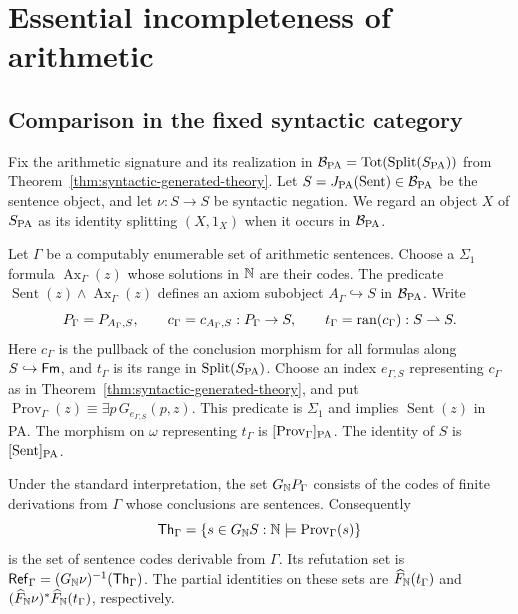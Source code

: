 \section{Essential incompleteness of arithmetic}\label{sec:arithmetic}

\subsection{Comparison in the fixed syntactic category}
\label{subsec:arithmetic-internal-comparison}

Fix the arithmetic signature and its realization in
$\mathcal B_{\mathrm{PA}}=\operatorname{Tot}(\operatorname{Split}(S_{\mathrm{PA}}))$ from
Theorem~\ref{thm:syntactic-generated-theory}.
Let $S=J_{\mathrm{PA}}(\operatorname{Sent})\in\mathcal B_{\mathrm{PA}}$ be
the sentence object, and let
$\nu:S\to S$ be syntactic negation.
We regard an object $X$ of $S_{\mathrm{PA}}$ as its identity splitting
$(X,1_X)$ when it occurs in $\mathcal B_{\mathrm{PA}}$.

Let $\Gamma$ be a computably enumerable set of arithmetic
sentences. Choose a $\Sigma_1$ formula
$\operatorname{Ax}_\Gamma(z)$ whose solutions in $\mathbb N$ are their codes.
The predicate
$\operatorname{Sent}(z)\land\operatorname{Ax}_\Gamma(z)$
defines an axiom subobject $A_\Gamma\hookrightarrow S$ in
$\mathcal B_{\mathrm{PA}}$. Write
\[
 P_\Gamma=P_{A_\Gamma,S},\qquad
 c_\Gamma=c_{A_\Gamma,S}:P_\Gamma\to S,\qquad
 t_\Gamma=\operatorname{ran}(c_\Gamma):S\rightharpoonup S.
\]
Here $c_\Gamma$ is the pullback of the conclusion morphism for all
formulas along $S\hookrightarrow\mathsf{Fm}$, and $t_\Gamma$ is its range in
$\operatorname{Split}(S_{\mathrm{PA}})$.
Choose an index $e_{\Gamma,S}$ representing $c_\Gamma$
as in Theorem~\ref{thm:syntactic-generated-theory}, and put
$\operatorname{Prov}_\Gamma(z)\equiv\exists p\,G_{e_{\Gamma,S}}(p,z)$.
This predicate is $\Sigma_1$ and implies
$\operatorname{Sent}(z)$ in PA. The morphism on $\omega$
representing $t_\Gamma$ is $[\operatorname{Prov}_\Gamma]_{\mathrm{PA}}$.
The identity of $S$ is $[\operatorname{Sent}]_{\mathrm{PA}}$.

Under the standard interpretation, the set
$G_{\mathbb N}P_\Gamma$ consists of the codes of finite derivations from $\Gamma$
whose conclusions are sentences. Consequently
\[
 \mathsf{Th}_\Gamma
   =\{s\in G_{\mathbb N}S:\mathbb N\models\operatorname{Prov}_\Gamma(s)\}
\]
is the set of sentence codes derivable from $\Gamma$.
Its refutation set is
$\mathsf{Ref}_\Gamma=(G_{\mathbb N}\nu)^{-1}(\mathsf{Th}_\Gamma)$.
The partial identities on these sets are
$\widehat F_{\mathbb N}(t_\Gamma)$ and
$(\widehat F_{\mathbb N}\nu)^*\widehat F_{\mathbb N}(t_\Gamma)$,
respectively.


